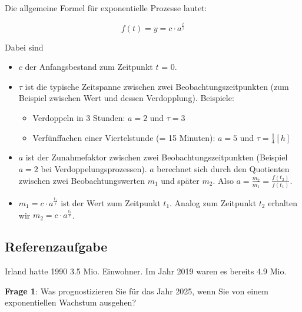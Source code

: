 Die allgemeine Formel für exponentielle Prozesse lautet:

$$f(t) = y = c\cdot{}a^{\frac{t}{\tau}}$$


Dabei sind
\begin{itemize}
\item $c$ der Anfangsbestand zum Zeitpunkt $t$ = 0.
\item $\tau$ ist die typische Zeitspanne zwischen zwei Beobachtungszeitpunkten (zum Beispiel zwischen Wert und dessen Verdopplung). Beispiele:
  \begin{itemize}
  \item Verdoppeln in 3 Stunden: $a=2$ und $\tau = 3$
  \item Verfünffachen einer Viertelstunde (= 15 Minuten): $a=5$ und $\tau=\frac{1}{4}[h]$
  \end{itemize}
\item $a$ ist der Zunahmefaktor zwischen zwei Beobachtungszeitpunkten (Beispiel $a=2$ bei Verdoppelungsprozessen).
  $a$ berechnet sich durch den Quotienten zwischen zwei Beobachtungswerten $m_1$ und später $m_2$. Also $a=\frac{m_2}{m_1}=\frac{f(t_2)}{f(t_1)}$.
\item $m_1=c\cdot{}a^{\frac{t_1}{\tau}}$ ist der Wert zum Zeitpunkt
  $t_1$. Analog zum Zeitpunkt $t_2$ erhalten wir
  $m_2=c\cdot{}a^{\frac{t_2}{\tau}}$. 
\end{itemize}
\newpage

\subsection{Referenzaufgabe}
Irland hatte 1990 3.5 Mio. Einwohner. Im Jahr 2019 waren es bereits 4.9 Mio.

\textbf{Frage 1}: Was prognostizieren Sie für das Jahr 2025, wenn Sie von einem exponentiellen Wachstum ausgehen?

\newpage

